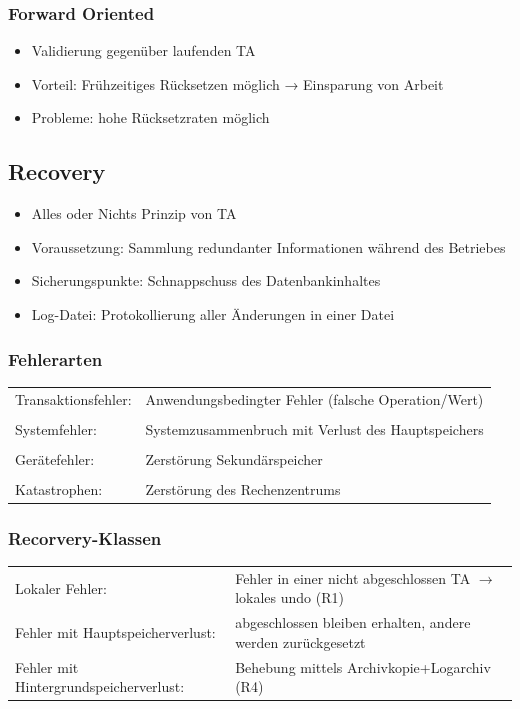 \documentclass[a4paper]{article}
\begin{document}
    \subsubsection{Forward Oriented}
    \begin{itemize}
        \item Validierung gegenüber laufenden TA
        \item Vorteil: Frühzeitiges Rücksetzen möglich → Einsparung von Arbeit
        \item Probleme: hohe Rücksetzraten möglich
    \end{itemize}

\subsection{Recovery}
\begin{itemize}
    \item Alles oder Nichts Prinzip von TA
    \item Voraussetzung: Sammlung redundanter Informationen während des Betriebes
    \item Sicherungspunkte: Schnappschuss des Datenbankinhaltes
    \item Log-Datei: Protokollierung aller Änderungen in einer Datei
\end{itemize}
    
    \subsubsection{Fehlerarten}
    \begin{tabular}{l l }
        Transaktionsfehler: &  Anwendungsbedingter Fehler (falsche Operation/Wert)\\
        & \\
        Systemfehler: & Systemzusammenbruch mit Verlust des Hauptspeichers \\
        & \\
        Gerätefehler: & Zerstörung Sekundärspeicher \\
        & \\
        Katastrophen: & Zerstörung des Rechenzentrums
    \end{tabular}
    
    \subsubsection{Recorvery-Klassen}
    \begin{tabular}{l p{7.5cm}}
        Lokaler Fehler: &  Fehler in einer nicht abgeschlossen TA $\to$ lokales undo (R1)\\
        Fehler mit Hauptspeicherverlust: & abgeschlossen bleiben erhalten, andere werden zurückgesetzt \\
        Fehler mit Hintergrundspeicherverlust: & Behebung mittels Archivkopie+Logarchiv (R4)
    \end{tabular}
    
\end{document}

